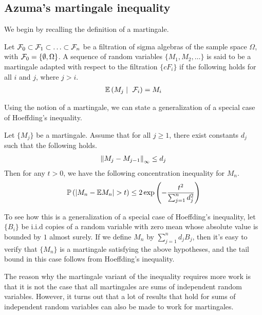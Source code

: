 \documentclass[11pt]{article}
\begin{document}
\subsection{Azuma's martingale inequality}
\label{sec:azum-mart-ineq}

We begin by recalling the definition of a martingale.
\begin{definition}[Martingale]
  Let $\mathcal{F}_0 \subset \mathcal{F}_1 \subset \ldots \subset \mathcal{F}_n$ be a filtration of sigma algebras of the sample space $\Omega$, with $\mathcal{F}_0 = \{\emptyset, \Omega\}$.
  A sequence of random variables $\{M_1, M_2, \ldots\}$ is said to be a martingale adapted with respect to the filtration $\{ cF_i\}$ if the following holds for all $i$ and $j$, where $j > i$.
  \begin{align*}
    \mathbb{E}\left( M_j \mid\ \mathcal{F}_i \right) = M_i
  \end{align*}
\end{definition}

Using the notion of a martingale, we can state a generalization of a special case of Hoeffding's inequality.

\begin{theorem}
  \label{thm:azuma-martingale}
  Let $\{M_j\}$ be a martingale. Assume that for all $j \geq 1$, there exist constants $d_j$ such that the following holds.
  \begin{align*}
    \left\lVert M_j - M_{j-1}\right\rVert_{\infty} \leq d_j
  \end{align*}
  Then for any $t > 0$, we have the following concentration inequality for $M_n$.
  \begin{align*}
    \mathbb{P}\left( \left| M_n - \mathbb{E} M_n \right| > t \right)
    \leq 2 \exp\left( - \frac{t^2}{\sum_{j=1}^n d_j^2} \right)
  \end{align*}
\end{theorem}
To see how this is a generalization of a special case of Hoeffding's inequality, let $\{B_i\}$ be i.i.d copies of a random variable with zero mean whose absolute value is bounded by $1$ almost surely.
If we define $M_n$ by $\sum_{j=1}^n d_jB_j$, then it's easy to verify that $\{M_n\}$ is a martingale satisfying the above hypotheses, and the tail bound in this case follows from Hoeffding's inequality.

The reason why the martingale variant of the inequality requires more work is that it is not the case that all martingales are sums of independent random variables.
However, it turns out that a lot of results that hold for sums of independent random variables can also be made to work for martingales.
\end{document}
